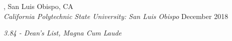 

, \hfill	San Luis Obispo, CA
\\ \textit{California Polytechnic State University: San Luis Obispo} \hfill	December 2018

 \textit{3.84 - Dean's List, Magna Cum Laude} 




